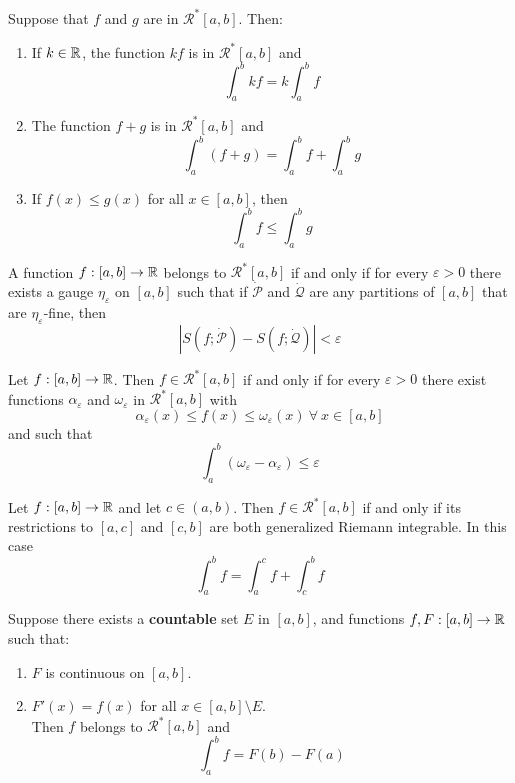 \begin{theorem}
	Suppose that $f$ and $g$ are in $\mathcal{R}^*[a,b]$. Then:
	\begin{enumerate}
		\item If $k \in \mathbb{R}$, the function $kf$ is in $\mathcal{R}^*[a,b]$ and
		      \[\displaystyle\int_{a}^{b}kf=k\displaystyle\int_{a}^{b}f\]

		\item The function $f+g$ is in $\mathcal{R}^*[a,b]$ and
		      \[\displaystyle\int_{a}^{b}(f+g)=\displaystyle\int_{a}^{b}f+\displaystyle\int_{a}^{b}g\]

		\item If $f(x)\leq g(x)$ for all $x \in [a,b]$, then
		      \[\displaystyle\int_{a}^{b}f \leq \displaystyle\int_{a}^{b}g\]
	\end{enumerate}
\end{theorem}

\begin{theorem}
	A function $f:[a,b] \to \mathbb{R}$ belongs to $\mathcal{R}^*[a,b]$ if and only if for every $\varepsilon >0$ there exists a gauge $\eta_\varepsilon$ on $[a,b]$ such that if $\dot{\mathcal{P}}$ and $\dot{\mathcal{Q}}$ are any partitions of $[a,b]$ that are $\eta_\varepsilon$-fine, then
	\[|S(f;\dot{\mathcal{P}})-S(f;\dot{\mathcal{Q}})|<\varepsilon\]
\end{theorem}

\begin{theorem}
	Let $f:[a,b] \to \mathbb{R}$. Then $f \in \mathcal{R}^*[a,b]$ if and only if for every $\varepsilon>0$ there exist functions $\alpha_\varepsilon$ and $\omega_\varepsilon$ in $\mathcal{R}^*[a,b]$ with
	\[\alpha_\varepsilon(x) \leq f(x) \leq \omega_\varepsilon(x)\ \forall\ x \in [a,b]\]
	and such that
	\[\displaystyle\int_{a}^{b}(\omega_\varepsilon-\alpha_\varepsilon) \leq \varepsilon\]
\end{theorem}

\begin{theorem}
	Let $f:[a,b] \to \mathbb{R}$ and let $c \in (a,b)$. Then $f \in \mathcal{R}^*[a,b]$ if and only if its restrictions to $[a,c]$ and $[c,b]$ are both generalized Riemann integrable. In this case
	\[\displaystyle\int_{a}^{b}f=\displaystyle\int_{a}^{c}f+\displaystyle\int_{c}^{b}f\]
\end{theorem}

\begin{theorem}
	Suppose there exists a \textbf{countable} set $E$ in $[a,b]$, and functions $f,F:[a,b] \to \mathbb{R}$ such that:
	\begin{enumerate}
		\item $F$ is continuous on $[a,b]$.
		\item $F'(x)=f(x)$ for all $x \in [a,b]\setminus E$.
		      \\Then $f$ belongs to $\mathcal{R}^*[a,b]$ and
		      \[\displaystyle\int_{a}^{b}f=F(b)-F(a)\]
	\end{enumerate}
\end{theorem}

